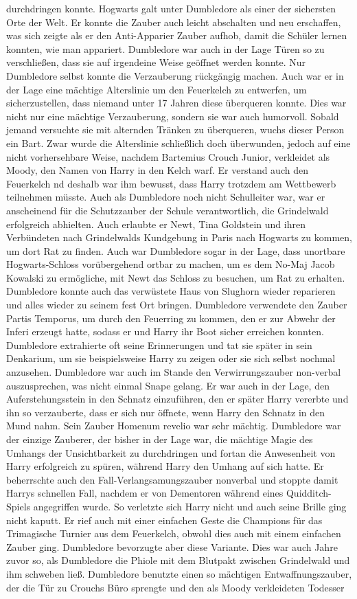 \documentclass[a4paper, 10pt]{article}
\begin{document}
durchdringen konnte. Hogwarts galt unter Dumbledore als einer der sichersten Orte der Welt. Er konnte die Zauber auch leicht abschalten und neu erschaffen, was sich zeigte als er den Anti-Apparier Zauber aufhob, damit die Schüler lernen konnten, wie man appariert. Dumbledore war auch in der Lage Türen so zu verschließen, dass sie auf irgendeine Weise geöffnet werden konnte. Nur Dumbledore selbst konnte die Verzauberung rückgängig machen. Auch war er in der Lage eine mächtige Alterslinie um den Feuerkelch zu entwerfen, um sicherzustellen, dass niemand unter 17 Jahren diese überqueren konnte. Dies war nicht nur eine mächtige Verzauberung, sondern sie war auch humorvoll. Sobald jemand versuchte sie mit alternden Tränken zu überqueren, wuchs dieser Person ein Bart. Zwar wurde die Alterslinie schließlich doch überwunden, jedoch auf eine nicht vorhersehbare Weise, nachdem Bartemius Crouch Junior, verkleidet als Moody, den Namen von Harry in den Kelch warf. Er verstand auch den Feuerkelch nd deshalb war ihm bewusst, dass Harry trotzdem am Wettbewerb teilnehmen müsste. Auch als Dumbledore noch nicht Schulleiter war, war er anscheinend für die Schutzzauber der Schule verantwortlich, die Grindelwald erfolgreich abhielten. Auch erlaubte er Newt, Tina Goldstein und ihren Verbündeten nach Grindelwalds Kundgebung in Paris nach Hogwarts zu kommen, um dort Rat zu finden. Auch war Dumbledore sogar in der Lage, dass unortbare Hogwarts-Schloss vorübergehend ortbar zu machen, um es dem No-Maj Jacob Kowalski zu ermögliche, mit Newt das Schloss zu besuchen, um Rat zu erhalten. Dumbledore konnte auch das verwüstete Haus von Slughorn wieder reparieren und alles wieder zu seinem fest Ort bringen. Dumbledore verwendete den Zauber Partis Temporus, um durch den Feuerring zu kommen, den er zur Abwehr der Inferi erzeugt hatte, sodass er und Harry ihr Boot sicher erreichen konnten. Dumbledore extrahierte oft seine Erinnerungen und tat sie später in sein Denkarium, um sie beispielsweise Harry zu zeigen oder sie sich selbst nochmal anzusehen. Dumbledore war auch im Stande den Verwirrungszauber non-verbal auszusprechen, was nicht einmal Snape gelang. Er war auch in der Lage, den Auferstehungsstein in den Schnatz einzuführen, den er später Harry vererbte und ihn so verzauberte, dass er sich nur öffnete, wenn Harry den Schnatz in den Mund nahm. Sein Zauber Homenum revelio war sehr mächtig. Dumbledore war der einzige Zauberer, der bisher in der Lage war, die mächtige Magie des Umhangs der Unsichtbarkeit zu durchdringen und fortan die Anwesenheit von Harry erfolgreich zu spüren, während Harry den Umhang auf sich hatte. Er beherrschte auch den Fall-Verlangsamungszauber nonverbal und stoppte damit Harrys schnellen Fall, nachdem er von Dementoren während eines Quidditch-Spiels angegriffen wurde. So verletzte sich Harry nicht und auch seine Brille ging nicht kaputt. Er rief auch mit einer einfachen Geste die Champions für das Trimagische Turnier aus dem Feuerkelch, obwohl dies auch mit einem einfachen Zauber ging. Dumbledore bevorzugte aber diese Variante. Dies war auch Jahre zuvor so, als Dumbledore die Phiole mit dem Blutpakt zwischen Grindelwald und ihm schweben ließ. Dumbledore benutzte einen so mächtigen Entwaffnungszauber, der die Tür zu Crouchs Büro sprengte und den als Moody verkleideten Todesser 
\end{document}
